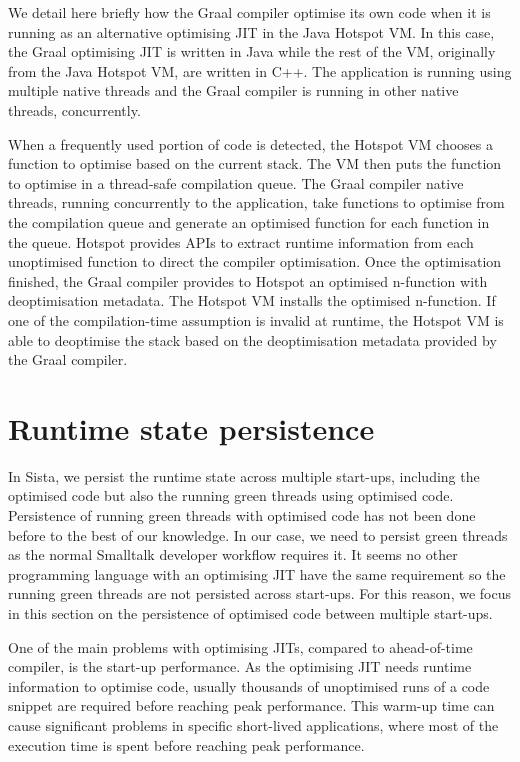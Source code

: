 \documentclass[a4paper,12pt,twoside]{../includes/ThesisStyle}
\begin{document}
We detail here briefly how the Graal compiler optimise its own code when it is running as an alternative optimising JIT in the Java Hotspot VM. In this case, the Graal optimising JIT is written in Java while the rest of the VM, originally from the Java Hotspot VM, are written in C++. The application is running using multiple native threads and the Graal compiler is running in other native threads, concurrently.

When a frequently used portion of code is detected, the Hotspot VM chooses a function to optimise based on the current stack. The VM then puts the function to optimise in a thread-safe compilation queue. The Graal compiler native threads, running concurrently to the application, take functions to optimise from the compilation queue and generate an optimised function for each function in the queue. Hotspot provides APIs to extract runtime information from each unoptimised function to direct the compiler optimisation. Once the optimisation finished, the Graal compiler provides to Hotspot an optimised n-function with deoptimisation metadata. The Hotspot VM installs the optimised n-function. If one of the compilation-time assumption is invalid at runtime, the Hotspot VM is able to deoptimise the stack based on the deoptimisation metadata provided by the Graal compiler.


\section{Runtime state persistence}
\label{sec:persistence}

In Sista, we persist the runtime state across multiple start-ups, including the optimised code but also the running green threads using optimised code. Persistence of running green threads with optimised code has not been done before to the best of our knowledge. In our case, we need to persist green threads as the normal Smalltalk developer workflow requires it. It seems no other programming language with an optimising JIT have the same requirement so the running green threads are not persisted across start-ups. For this reason, we focus in this section on the persistence of optimised code between multiple start-ups.

One of the main problems with optimising JITs, compared to ahead-of-time compiler, is the start-up performance. As the optimising JIT needs runtime information to optimise code, usually thousands of unoptimised runs of a code snippet are required before reaching peak performance. This warm-up time can cause significant problems in specific short-lived applications, where most of the execution time is spent before reaching peak performance. 
\end{document}
